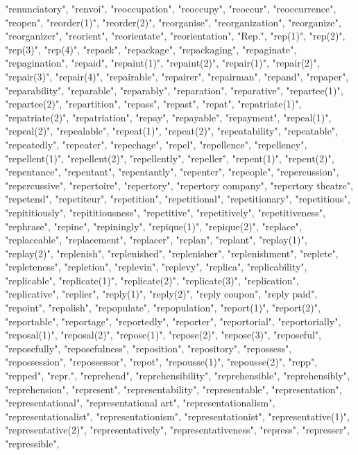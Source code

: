 "renunciatory",
"renvoi",
"reoccupation",
"reoccupy",
"reoccur",
"reoccurrence",
"reopen",
"reorder(1)",
"reorder(2)",
"reorganise",
"reorganization",
"reorganize",
"reorganizer",
"reorient",
"reorientate",
"reorientation",
"Rep.",
"rep(1)",
"rep(2)",
"rep(3)",
"rep(4)",
"repack",
"repackage",
"repackaging",
"repaginate",
"repagination",
"repaid",
"repaint(1)",
"repaint(2)",
"repair(1)",
"repair(2)",
"repair(3)",
"repair(4)",
"repairable",
"repairer",
"repairman",
"repand",
"repaper",
"reparability",
"reparable",
"reparably",
"reparation",
"reparative",
"repartee(1)",
"repartee(2)",
"repartition",
"repass",
"repast",
"repat",
"repatriate(1)",
"repatriate(2)",
"repatriation",
"repay",
"repayable",
"repayment",
"repeal(1)",
"repeal(2)",
"repealable",
"repeat(1)",
"repeat(2)",
"repeatability",
"repeatable",
"repeatedly",
"repeater",
"repechage",
"repel",
"repellence",
"repellency",
"repellent(1)",
"repellent(2)",
"repellently",
"repeller",
"repent(1)",
"repent(2)",
"repentance",
"repentant",
"repentantly",
"repenter",
"repeople",
"repercussion",
"repercussive",
"repertoire",
"repertory",
"repertory company",
"repertory theatre",
"repetend",
"repetiteur",
"repetition",
"repetitional",
"repetitionary",
"repetitious",
"repititiously",
"repititiousness",
"repetitive",
"repetitively",
"repetitiveness",
"rephrase",
"repine",
"repiningly",
"repique(1)",
"repique(2)",
"replace",
"replaceable",
"replacement",
"replacer",
"replan",
"replant",
"replay(1)",
"replay(2)",
"replenish",
"replenished",
"replenisher",
"replenishment",
"replete",
"repleteness",
"repletion",
"replevin",
"replevy",
"replica",
"replicability",
"replicable",
"replicate(1)",
"replicate(2)",
"replicate(3)",
"replication",
"replicative",
"replier",
"reply(1)",
"reply(2)",
"reply coupon",
"reply paid",
"repoint",
"repolish",
"repopulate",
"repopulation",
"report(1)",
"report(2)",
"reportable",
"reportage",
"reportedly",
"reporter",
"reportorial",
"reportorially",
"reposal(1)",
"reposal(2)",
"repose(1)",
"repose(2)",
"repose(3)",
"reposeful",
"reposefully",
"reposefulness",
"reposition",
"repository",
"repossess",
"repossession",
"repossessor",
"repot",
"repousse(1)",
"repousse(2)",
"repp",
"repped",
"repr.",
"reprehend",
"reprehensibility",
"reprehensible",
"reprehensibly",
"reprehension",
"represent",
"representability",
"representable",
"representation",
"representational",
"representational art",
"representationalism",
"representationalist",
"representationism",
"representationist",
"representative(1)",
"representative(2)",
"representatively",
"representativeness",
"repress",
"represser",
"repressible",
